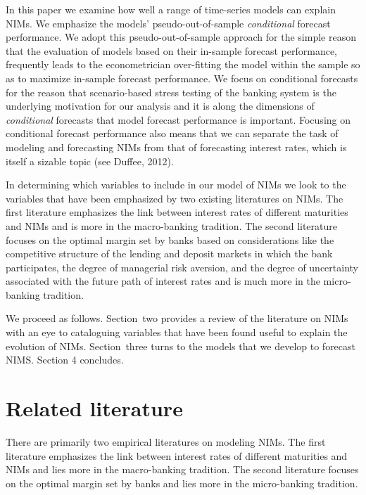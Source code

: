 \documentclass[11pt]{article}
\begin{document}
In this paper we examine how well a range of time-series models can explain NIMs. We emphasize the models' pseudo-out-of-sample \textit{conditional} forecast performance. We adopt this pseudo-out-of-sample approach for the simple reason that the evaluation of models based on their in-sample forecast performance, frequently leads to the econometrician over-fitting the model within the sample so as to maximize in-sample forecast performance. We focus on conditional forecasts for the reason that scenario-based stress testing of the banking system is the underlying motivation for our analysis and it is along the dimensions of \textit{conditional} forecasts that model forecast performance is important.  Focusing on conditional forecast performance also means that we can separate the task of modeling and forecasting NIMs from that of forecasting interest rates, which is itself a sizable topic (see Duffee, 2012).

In determining which variables to include in our model of NIMs we look to the variables that have been emphasized by two existing literatures on NIMs.  The first literature emphasizes the link between interest rates of different maturities and NIMs and is more in the macro-banking tradition. The second literature focuses on the optimal margin set by banks based on considerations like the competitive structure of the lending and deposit markets in which the bank participates, the degree of managerial risk aversion, and the degree of uncertainty associated with the future path of interest rates and is much more in the micro-banking tradition.  

We proceed as follows. Section~two provides a review of the literature on NIMs with an eye to cataloguing variables that have been found useful to explain the evolution of NIMs. Section~three turns to the models that we develop to forecast NIMS. Section 4 concludes.

\section{Related literature}

\vspace{-0.1in}
There are primarily two empirical literatures on modeling NIMs.  The first literature emphasizes the link between interest rates of different maturities and NIMs and lies more in the macro-banking tradition.  The second literature focuses on the optimal margin set by banks and lies more in the micro-banking tradition.
\end{document}

